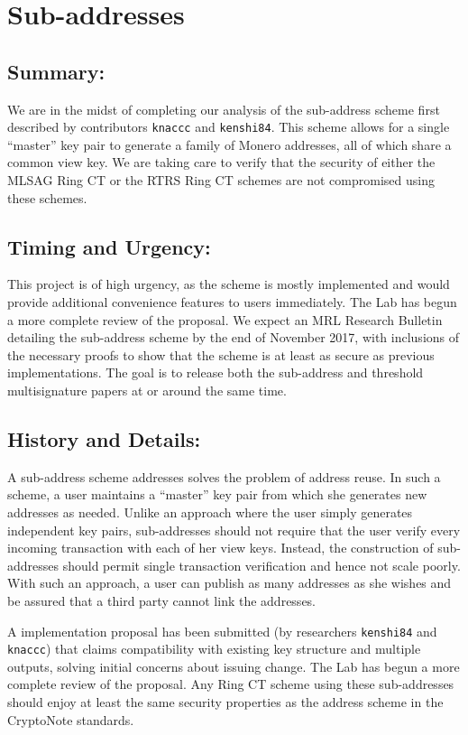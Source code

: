 \documentclass[12pt,english]{mrl}
\theoremstyle{definition}
\numberwithin{equation}{section}
\numberwithin{figure}{section}
\numberwithin{equation}{section}
\numberwithin{equation}{section}
\numberwithin{figure}{section}
\begin{document}
\section{Sub-addresses}


\subsection{Summary:} 

We are in the midst of completing our analysis of the sub-address scheme first described by contributors \texttt{knaccc} and \texttt{kenshi84}. This scheme allows for a single ``master'' key pair to generate a family of Monero addresses, all of which share a common view key. We are taking care to verify that the security of either the MLSAG Ring CT or the RTRS Ring CT schemes are not compromised using these schemes.

\subsection{Timing and Urgency:} 

This project is of high urgency, as the scheme is mostly implemented and would provide additional convenience features to users immediately. The Lab has begun a more complete review of the proposal. We expect an MRL Research Bulletin detailing the sub-address scheme by the end of November 2017, with inclusions of the necessary proofs to show that the scheme is at least as secure as previous implementations. The goal is to release both the sub-address and threshold multisignature papers at or around the same time.

\subsection{History and Details:} 

A sub-address scheme addresses solves the problem of address reuse. In such a scheme, a user maintains a ``master'' key pair from which she generates new addresses as needed. Unlike an approach where the user simply generates independent key pairs, sub-addresses should not require that the user verify every incoming transaction with each of her view keys. Instead, the construction of sub-addresses should permit single transaction verification and hence not scale poorly. With such an approach, a user can publish as many addresses as she wishes and be assured that a third party cannot link the addresses. 

A implementation proposal has been submitted (by researchers \texttt{kenshi84} and \texttt{knaccc}) that claims compatibility with existing key structure and multiple outputs, solving initial concerns about issuing change. The Lab has begun a more complete review of the proposal. Any Ring CT scheme using these sub-addresses should enjoy at least the same security properties as the address scheme in the CryptoNote standards. 
\end{document}
